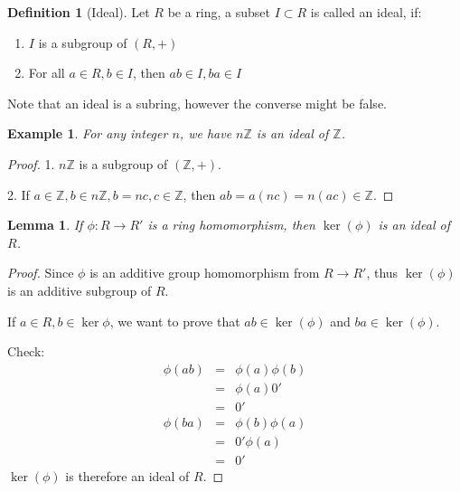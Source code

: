 \documentclass{article}
\theoremstyle{MyNonumberplain}
\theoremstyle{break}
\newtheorem*{proof}{Proof. }
\theoremstyle{break}
\newtheorem{example}{Example}[section]
\newtheorem{lemma}[theorem]{Lemma}
\theoremstyle{break}
\theoremstyle{definition}
\theoremstyle{break}
\newtheorem{definition}{Definition}[section]
\begin{document}
\begin{defbox}
    \begin{definition}[Ideal]
        Let $R$ be a ring, a subset $I \subset R$ is called an ideal, if:\bigskip
        \begin{enumerate}
          \item $I$ is a subgroup of $(R, +)$\bigskip
          
          \item For all $a \in R, b \in I$, then $a b \in I, b a \in I$\bigskip
        \end{enumerate}
        Note that an ideal is a subring, however the converse might be false.
    \end{definition}
\end{defbox}

\begin{expbox}
    \begin{example}
        For any integer $n$, we have $n\mathbb{Z}$ is an ideal of $\mathbb{Z}$.
    \end{example}
    \begin{prfbox}
        \begin{proof}
            1. $n\mathbb{Z}$ is a subgroup of $(\mathbb{Z}, +)$.\bigskip

            2. If $a \in \mathbb{Z}, b \in n\mathbb{Z}, b = n c, c \in \mathbb{Z}$, then
            $a b = a (n c) = n (a c) \in \mathbb{Z}$.
        \end{proof}
    \end{prfbox}
\end{expbox}

\begin{thmbox}
    \begin{lemma}
        If $\phi : R \rightarrow R'$ is a ring homomorphism, then $\ker (\phi)$ is an
        ideal of $R$.
    \end{lemma}
    \begin{prfbox}
        \begin{proof}
            Since $\phi$ is an additive group homomorphism from $R \rightarrow R'$,
            thus $\ker (\phi)$ is an additive subgroup of $R$.\bigskip
            
            If $a \in R, b \in \ker \phi$, we want to prove that $a b \in \ker (\phi)$ and
            $b a \in \ker (\phi)$.\bigskip
            
            Check:
            \begin{eqnarray*}
              \phi (a b) & = & \phi (a) \phi (b)\\
              & = & \phi (a) 0'\\
              & = & 0'\\
              \phi (b a) & = & \phi (b) \phi (a)\\
              & = & 0' \phi (a)\\
              & = & 0'
            \end{eqnarray*}
            $\ker (\phi)$ is therefore an ideal of $R$.
        \end{proof}
    \end{prfbox}
\end{thmbox}
\end{document}
